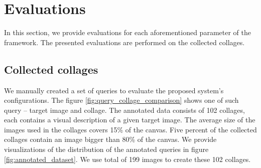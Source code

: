 



\chapter{Evaluations}

In this section, we provide evaluations for each aforementioned parameter of the framework. The presented evaluations are performed on the collected collages.

\section{Collected collages}

We manually created a set of queries to evaluate the proposed system's configurations. The figure \ref{fig:query_collage_comparison} shows one of such query -- target image and collage. The annotated data consists of 102 collages, each contains a visual description of a given target image. The average size of the images used in the collages covers 15\% of the canvas. Five percent of the collected collages contain an image bigger than 80\% of the canvas. We provide visualizations of the distribution of the annotated queries in figure \ref{fig:annotated_dataset}. We use total of 199 images to create these 102 collages.


